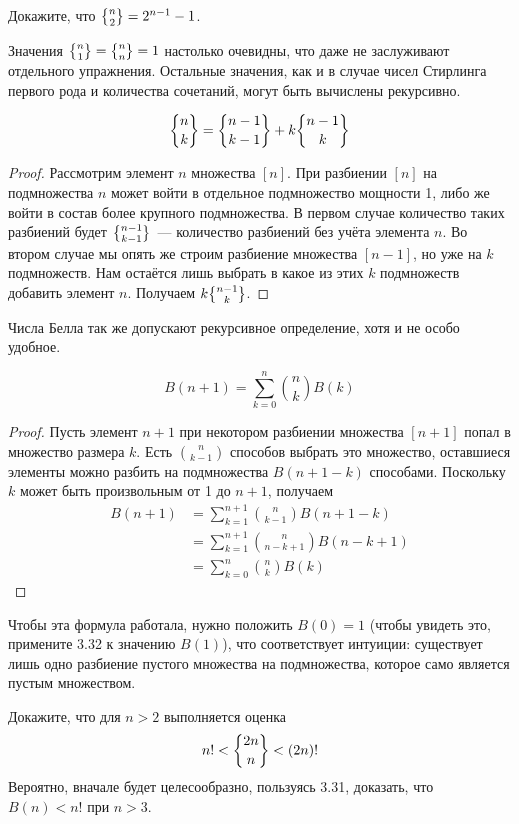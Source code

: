 \begin{exercise}
Докажите, что $\sstirling{n}{2} = 2^{n-1} - 1$.
\end{exercise}

Значения $\sstirling{n}{1} = \sstirling{n}{n} = 1$ настолько очевидны, что даже не заслуживают отдельного упражнения. Остальные значения, как и в случае чисел Стирлинга первого рода и количества сочетаний, могут быть вычислены рекурсивно.

\begin{thm}
$$\sstirling{n}{k} = \sstirling{n-1}{k-1} + k\sstirling{n-1}{k}$$
\end{thm}
\begin{proof}
Рассмотрим элемент $n$ множества $[n]$. При разбиении $[n]$ на подмножества $n$ может войти в отдельное подмножество мощности 1, либо же войти в состав более крупного подмножества. В первом случае количество таких разбиений будет $\sstirling{n-1}{k-1}$~— количество разбиений без учёта элемента $n$. Во втором случае мы опять же строим разбиение множества $[n-1]$, но уже на $k$ подмножеств. Нам остаётся лишь выбрать в какое из этих $k$ подмножеств добавить элемент $n$. Получаем $k\sstirling{n-1}{k}$.
\end{proof}

Числа Белла так же допускают рекурсивное определение, хотя и не особо удобное.

\begin{thm}
$$B(n+1) = \sum_{k=0}^n{n \choose k} B(k)$$
\end{thm}
\begin{proof}
Пусть элемент $n+1$ при некотором разбиении множества $[n+1]$ попал в множество размера $k$. Есть $n\choose k - 1$ способов выбрать это множество, оставшиеся элементы можно разбить на подмножества $B(n+1-k)$ способами. Поскольку $k$ может быть произвольным от 1 до $n+1$, получаем
\begin{align*}
B(n+1) & = \sum_{k=1}^{n+1}{n\choose k-1}B(n+1-k)\\
& = \sum_{k=1}^{n+1}{n\choose n-k+1}B(n-k+1) \\
& = \sum_{k=0}^{n}{n\choose k}B(k)
\end{align*}
\end{proof}

Чтобы эта формула работала, нужно положить $B(0) = 1$ (чтобы увидеть это, примените 3.32 к значению $B(1)$), что соответствует интуиции: существует лишь одно разбиение пустого множества на подмножества, которое само является пустым множеством.

\begin{exercise}
Докажите, что для $n>2$ выполняется оценка
$$n! < \sstirling{2n}{n} < (2n)!$$
Вероятно, вначале будет целесообразно, пользуясь 3.31, доказать, что $B(n) < n!$ при $n>3$.
\end{exercise}
